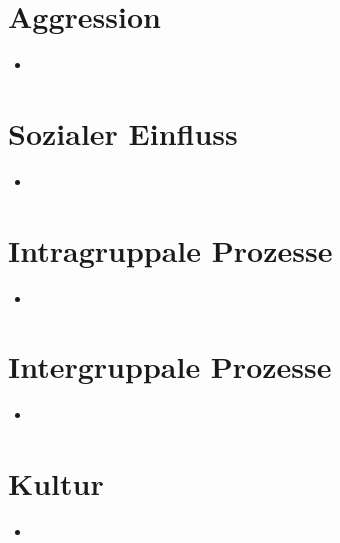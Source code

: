 \documentclass[11pt, paper=a4, twocolumn]{scrartcl}
\begin{document}
	\section{Aggression}
		\begin{itemize}
			\item
		\end{itemize}


	\section{Sozialer Einfluss}
		\begin{itemize}
			\item
		\end{itemize}



	\section{Intragruppale Prozesse}
		\begin{itemize}
			\item
		\end{itemize}


	\section{Intergruppale Prozesse}
		\begin{itemize}
			\item
		\end{itemize}


	\section{Kultur}
		\begin{itemize}
			\item
		\end{itemize}
\end{document}
